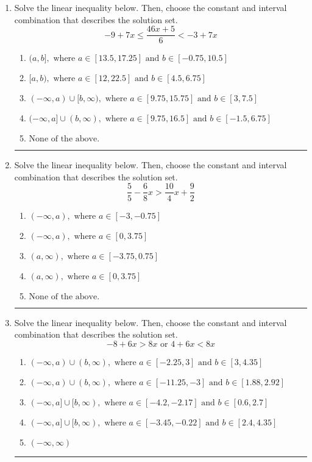 \documentclass[14pt]{extbook}
\newcommand{\litem}[1]{\item#1\hspace*{-1cm}\rule{\textwidth}{0.4pt}}
\begin{document}
\begin{enumerate}
{\begin{enumerate}[label=\Alph*.]
\end{enumerate} }
\litem{
Solve the linear inequality below. Then, choose the constant and interval combination that describes the solution set.\[ -9 + 7 x \leq \frac{46 x + 5}{6} < -3 + 7 x \]\begin{enumerate}[label=\Alph*.]
\item \( (a, b], \text{ where } a \in [13.5, 17.25] \text{ and } b \in [-0.75, 10.5] \)
\item \( [a, b), \text{ where } a \in [12, 22.5] \text{ and } b \in [4.5, 6.75] \)
\item \( (-\infty, a) \cup [b, \infty), \text{ where } a \in [9.75, 15.75] \text{ and } b \in [3, 7.5] \)
\item \( (-\infty, a] \cup (b, \infty), \text{ where } a \in [9.75, 16.5] \text{ and } b \in [-1.5, 6.75] \)
\item \( \text{None of the above.} \)

\end{enumerate} }
\litem{
Solve the linear inequality below. Then, choose the constant and interval combination that describes the solution set.\[ \frac{5}{5} - \frac{6}{8} x > \frac{10}{4} x + \frac{9}{2} \]\begin{enumerate}[label=\Alph*.]
\item \( (-\infty, a), \text{ where } a \in [-3, -0.75] \)
\item \( (-\infty, a), \text{ where } a \in [0, 3.75] \)
\item \( (a, \infty), \text{ where } a \in [-3.75, 0.75] \)
\item \( (a, \infty), \text{ where } a \in [0, 3.75] \)
\item \( \text{None of the above}. \)

\end{enumerate} }
\litem{
Solve the linear inequality below. Then, choose the constant and interval combination that describes the solution set.\[ -8 + 6 x > 8 x \text{ or } 4 + 6 x < 8 x \]\begin{enumerate}[label=\Alph*.]
\item \( (-\infty, a) \cup (b, \infty), \text{ where } a \in [-2.25, 3] \text{ and } b \in [3, 4.35] \)
\item \( (-\infty, a) \cup (b, \infty), \text{ where } a \in [-11.25, -3] \text{ and } b \in [1.88, 2.92] \)
\item \( (-\infty, a] \cup [b, \infty), \text{ where } a \in [-4.2, -2.17] \text{ and } b \in [0.6, 2.7] \)
\item \( (-\infty, a] \cup [b, \infty), \text{ where } a \in [-3.45, -0.22] \text{ and } b \in [2.4, 4.35] \)
\item \( (-\infty, \infty) \)


\end{enumerate}}
\end{enumerate}
\end{document}

